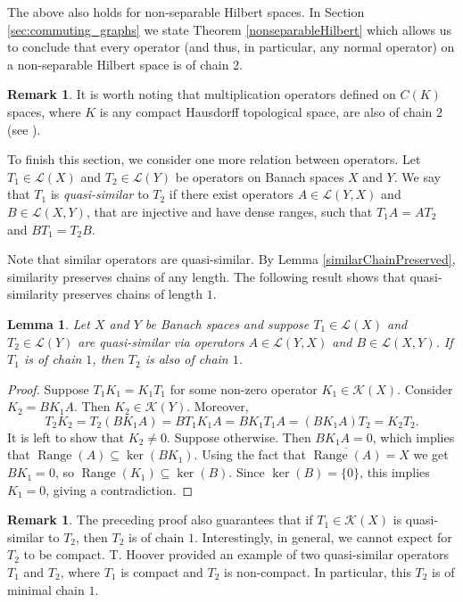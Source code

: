 \documentclass[a4paper,12pt]{article}
\newtheorem{lemma}[thm]{Lemma}
\theoremstyle{definition}
\newtheorem{remark}[thm]{Remark}
\numberwithin{equation}{section}
\numberwithin{thm}{section}
\begin{document}
The above also holds for non-separable Hilbert spaces. In Section \ref{sec:commuting_graphs} we state Theorem \ref{nonseparableHilbert} which allows us to conclude that every operator (and thus, in particular, any normal operator) on a non-separable Hilbert space is of chain $2$.


\begin{remark}
It is worth noting that multiplication operators defined on $C(K)$ spaces, where $K$ is any compact Hausdorff topological space, are also of chain $2$ (see \cite[Corollary 2.7]{AbramovicMultiplication}).
\end{remark}

To finish this section, we consider one more relation between operators. Let $T_1 \in \mathcal{L}(X)$ and $T_2 \in \mathcal{L}(Y)$ be operators on Banach spaces $X$ and $Y$. We say that $T_1$ is \textit{quasi-similar} to $T_2$ if there exist operators $A\in \mathcal{L}(Y,X)$ and $B\in \mathcal{L}(X,Y)$, that are injective and have dense ranges, such that $T_1 A=AT_2$ and $BT_1 = T_2 B.$

Note that similar operators are quasi-similar. By Lemma \ref{similarChainPreserved}, similarity preserves chains of any length. The following result shows that quasi-similarity preserves chains of length $1$. 
\begin{lemma}
\label{quasi-similar}
Let $X$ and $Y$ be Banach spaces and suppose $T_1\in \mathcal{L}(X)$ and $T_2\in \mathcal{L}(Y)$ are quasi-similar via operators $A\in \mathcal{L}(Y,X)$ and $B\in \mathcal{L}(X,Y)$. If $T_1$ is of chain $1$, then $T_2$ is also of chain $1$.
\end{lemma}
\begin{proof}
Suppose $T_1K_1 = K_1T_1$ for some non-zero operator $K_1\in \mathcal{K}(X)$. Consider $K_2 = BK_1A.$ Then $K_2 \in \mathcal{K}(Y)$. Moreover,
$$T_2K_2 = T_2 (BK_1A) = BT_1K_1A = BK_1T_1A = (BK_1A)T_2 = K_2 T_2.$$
It is left to show that $K_2 \neq 0$. Suppose otherwise. Then $BK_1A=0$, which implies that $\operatorname{Range}(A) \subseteq \ker (BK_1)$. Using the fact that $\overline{\operatorname{Range}(A)} =X$  we get $BK_1 = 0$, so $\operatorname{Range}(K_1) \subseteq \ker(B)$. Since $\ker(B)=\{0\}$, this implies $K_1=0$, giving a contradiction.
\end{proof}

\begin{remark}
The preceding proof also guarantees that if $T_1 \in \mathcal{K}(X)$ is quasi-similar to $T_2$, then $T_2$ is of chain $1$. Interestingly, in general, we cannot expect for $T_2$ to be compact. T. Hoover \cite{Hoover} provided an example of two quasi-similar operators $T_1$ and $T_2$, where $T_1$ is compact and $T_2$ is non-compact. In particular, this $T_2$ is of minimal chain $1$.
\end{remark}
\end{document}
